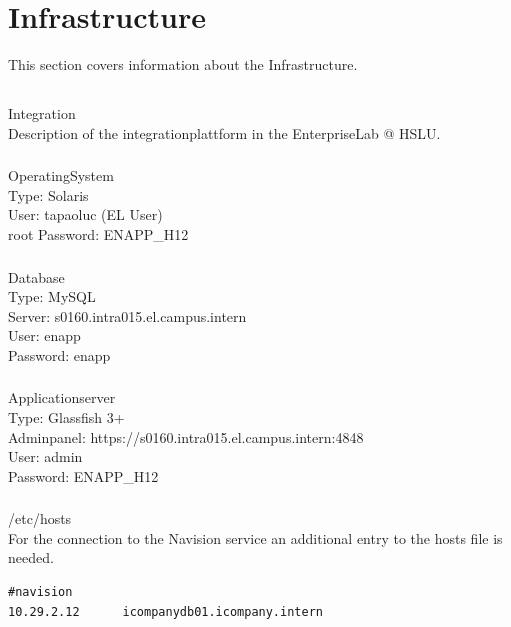 \documentclass[11pt]{amsart}
\begin{document}
\section{Infrastructure} 
%
This section covers information about the Infrastructure. \\
% 
\subsection{}Integration \\
Description of the integrationplattform in the EnterpriseLab @ HSLU.\\
\subsubsection{}OperatingSystem \\
Type: Solaris \\
User: tapaoluc (EL User) \\
root Password: ENAPP\_H12
%
\subsubsection{}Database \\
Type: MySQL \\
Server: s0160.intra015.el.campus.intern \\
User: enapp \\
Password: enapp 
%
\subsubsection{}Applicationserver \\
Type: Glassfish 3+ \\
Adminpanel: https://s0160.intra015.el.campus.intern:4848 \\
User: admin \\
Password: ENAPP\_H12 \\
%
\subsubsection{}/etc/hosts \\
For the connection to the Navision service an additional entry to the hosts file is needed.\
\begin{verbatim}
#navision
10.29.2.12      icompanydb01.icompany.intern
\end{verbatim}
%
\end{document}
